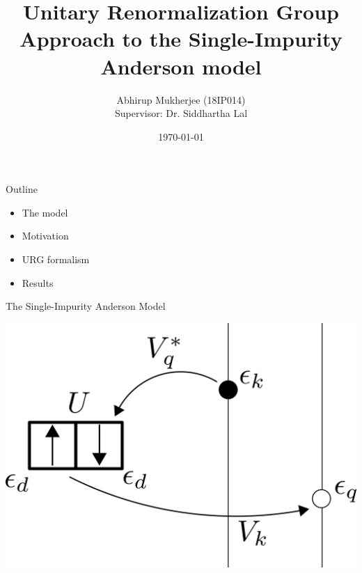 \documentclass{beamer}
\title{Unitary Renormalization Group Approach to the Single-Impurity Anderson model}
\subtitle{}
\date{\today}
\author{Abhirup Mukherjee (18IP014)\\[5mm]{Supervisor: Dr. Siddhartha Lal}}
\institute{IISER Kolkata}
\begin{document}
\maketitle

\begin{frame}{Outline}

\begin{itemize}
  \item The model
  \item Motivation
  \item URG formalism
  \item Results 
\end{itemize}

\end{frame}

\begin{frame}{The Single-Impurity Anderson Model}

\vspace*{20pt}
\begin{figure}
\centering
\def\svgwidth{\columnwidth}
\hspace*{-20pt}
\end{figure}
\vspace*{-40pt}
\centering\includegraphics[scale=0.4]{model_scheme.png}

\end{frame}
\end{document}
